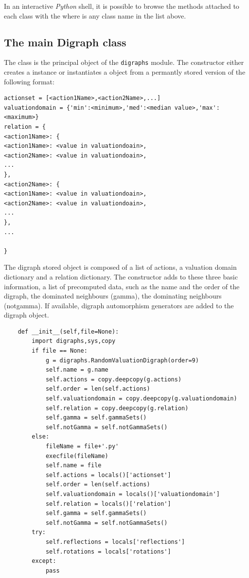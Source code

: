 \documentclass{article}
\newcommand{\+}{\verb+}
\renewcommand{\*}{\back{}}
\newcommand{\Dg}{\texttt{digraphs}\xspace }
\newcommand{\Py}{\emph{Python}\xspace }
\begin{document}
\begin{center}
\begin{example}
\end{example}

In an interactive \Py shell, it is possible to browse the methods attached to each class with the  where  is any class name in the list above. 

\subsection{The main Digraph class}
The  class is the principal object of the \Dg module. The constructor   either creates a  instance or instantiates a  object from a permantly stored version of the following format: 
\begin{example}
\begin{verbatim}
actionset = [<action1Name>,<action2Name>,...]
valuationdomain = {'min':<minimum>,'med':<median value>,'max':<maximum>}
relation = {
<action1Name>: { 
<action1Name>: <value in valuationdoain>,
<action2Name>: <value in valuationdoain>,
...
},
<action2Name>: { 
<action1Name>: <value in valuationdoain>,
<action2Name>: <value in valuationdoain>,
...
},
...

}
\end{verbatim}
\end{example}

The digraph stored object is composed of a list of actions, a valuation domain dictionary and a relation dictionary. The constructor adds to these three basic information, a list of precomputed data, such as the name and the order of the digraph, the dominated neighbours (gamma), the dominating neighbours (notgamma). If available, digraph automorphism generators are added to the digraph object.
\begin{example}
\begin{verbatim}
    def __init__(self,file=None):
        import digraphs,sys,copy
        if file == None:
            g = digraphs.RandomValuationDigraph(order=9)
            self.name = g.name
            self.actions = copy.deepcopy(g.actions)
            self.order = len(self.actions)
            self.valuationdomain = copy.deepcopy(g.valuationdomain)
            self.relation = copy.deepcopy(g.relation)
            self.gamma = self.gammaSets()
            self.notGamma = self.notGammaSets()          
        else:
            fileName = file+'.py'
            execfile(fileName)
            self.name = file
            self.actions = locals()['actionset']
            self.order = len(self.actions)
            self.valuationdomain = locals()['valuationdomain']
            self.relation = locals()['relation']
            self.gamma = self.gammaSets()
            self.notGamma = self.notGammaSets()
        try:
            self.reflections = locals['reflections']
            self.rotations = locals['rotations']
        except:
            pass
\end{verbatim}
\end{example}


\end{center}
\end{document}
